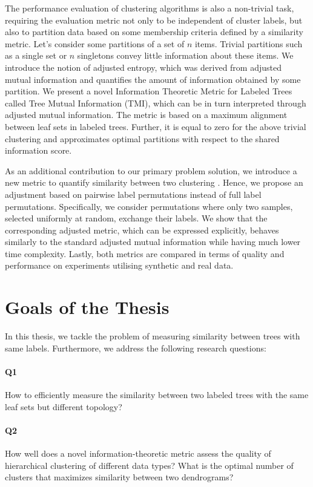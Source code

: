 The performance evaluation of clustering algorithms is also a non-trivial task, requiring the evaluation metric not only to be independent of cluster labels, but also to partition data based on some membership criteria defined by a similarity metric. Let's consider some partitions of a set of $n$ items. Trivial partitions such as a single set or $n$ singletons convey little information about these items. We introduce the notion of adjusted entropy, which was derived from adjusted mutual information and quantifies the amount of information obtained by some partition. We present a novel Information Theoretic Metric for Labeled Trees called Tree Mutual Information (TMI), which can be in turn interpreted through adjusted mutual information. The metric is based on a maximum alignment between leaf sets in labeled trees. Further, it is equal to zero for the above trivial clustering and approximates optimal partitions with respect to the shared information score.

As an additional contribution to our primary problem solution, we introduce a new metric to quantify similarity between two clustering \cite{Lazarenko2021pairwise}. Hence, we propose an adjustment based on pairwise label permutations instead of full label permutations. Specifically, we consider permutations where only two samples, selected uniformly at random, exchange their labels. We show that the corresponding adjusted metric, which can be expressed explicitly, behaves similarly to the standard adjusted mutual information while having much lower time complexity. Lastly, both metrics are compared in terms of quality and performance on experiments utilising synthetic and real data.  

\section{Goals of the Thesis}

In this thesis, we tackle the problem of measuring similarity between trees with same labels. Furthermore, we address the following research questions:

\paragraph{Q1}
\label{q1}
How to efficiently measure the similarity between two labeled trees with the same leaf sets but different topology?

\paragraph{Q2}
\label{q2}
How well does a novel information-theoretic metric assess the quality of hierarchical clustering of different data types? What is the optimal number of clusters that maximizes similarity between two dendrograms?


